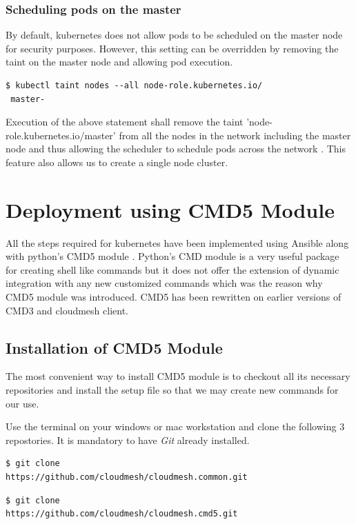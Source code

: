 \documentclass[9pt,twocolumn,twoside]{../../styles/osajnl}
\begin{document}
{\subsubsection{Scheduling pods on the master}
By default, kubernetes does not allow pods to be
scheduled on the master node for security purposes. However, this
setting can be overridden by removing the taint on the master node and
allowing pod execution.

\begin{verbatim}
$ kubectl taint nodes --all node-role.kubernetes.io/
 master-
\end{verbatim}

\noindent
Execution of the above statement shall remove the taint
'node-role.kubernetes.io/master' from all the nodes in the network
including the master node and thus allowing the scheduler to schedule
pods across the network \cite{www-kubernetes-kubeadm}. This feature
also allows us to create a single node cluster.

\section{Deployment using CMD5 Module}
All the steps required for kubernetes have been implemented using
Ansible along with python's CMD5 module \cite{www-cmd5}. Python's
CMD module is a very useful package for creating shell like commands
but it does not offer the extension of dynamic integration with any
new customized commands which was the reason why CMD5 module was
introduced. CMD5 has been rewritten on earlier versions of CMD3 and
cloudmesh client.

\subsection{Installation of CMD5 Module}
The most convenient way to install CMD5 module is to checkout all its
necessary repositories and install the setup file so that we may
create new commands for our use.

\noindent
Use the terminal on your windows or mac workstation and clone the
following 3 repostories. It is mandatory to have \emph{Git}
\cite{www-git} already installed.

\begin{verbatim}
$ git clone
https://github.com/cloudmesh/cloudmesh.common.git
\end{verbatim}

\begin{verbatim}
$ git clone
https://github.com/cloudmesh/cloudmesh.cmd5.git
\end{verbatim}

}
\end{document}
